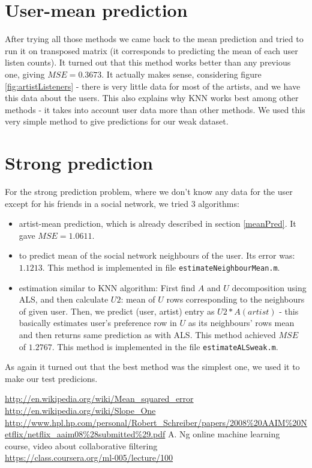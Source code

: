 \documentclass{report}
\begin{document}
\section{User-mean prediction}
After trying all those methods we came back to the mean prediction and tried to run it on transposed matrix (it corresponds to predicting the mean of each user listen counts). It turned out that this method works better than any previous one, giving $MSE=0.3673$. It actually makes sense, considering figure \ref{fig:artistListeners} - there is very little data for most of the artists, and we have this data about the users. This also explains why KNN works best among other methods - it takes into account user data more than other methods. We used this very simple method to give predictions for our weak dataset.

\section{Strong prediction}
For the strong prediction problem, where we don't know any data for the user except for his friends in a social network, we tried $3$ algorithms:
\begin{itemize}
\item artist-mean prediction, which is already described in section \ref{meanPred}. It gave $MSE=1.0611$.
\item to predict mean of the social network neighbours of the user. Its error was: $1.1213$. This method is implemented in file \texttt{estimateNeighbourMean.m}.
\item estimation similar to KNN algorithm: First find $A$ and $U$ decomposition using ALS, and then calculate $U2$: mean of $U$ rows corresponding to the neighbours of given user. Then, we predict (user, artist) entry as $U2 * A(artist)$ - this basically estimates user's preference row in $U$ as its neighbours' rows mean and then returns same prediction as with ALS. This method achieved $MSE$ of $1.2767$. This method is implemented in the file \texttt{estimateALSweak.m}.
\end{itemize}

As again it turned out that the best method was the simplest one, we used it to make our test predicions.

\begingroup
\renewcommand{\cleardoublepage}{}
\renewcommand{\clearpage}{}
\begin{thebibliography}{9}

  \url{http://en.wikipedia.org/wiki/Mean_squared_error}
  \url{http://en.wikipedia.org/wiki/Slope_One}
  \url{http://www.hpl.hp.com/personal/Robert_Schreiber/papers/2008\%20AAIM\%20Netflix/netflix_aaim08\%28submitted\%29.pdf}
   A. Ng online machine learning course,
   video about collaborative filtering\\
  \url{https://class.coursera.org/ml-005/lecture/100}


\end{thebibliography}
\endgroup
\end{document}

